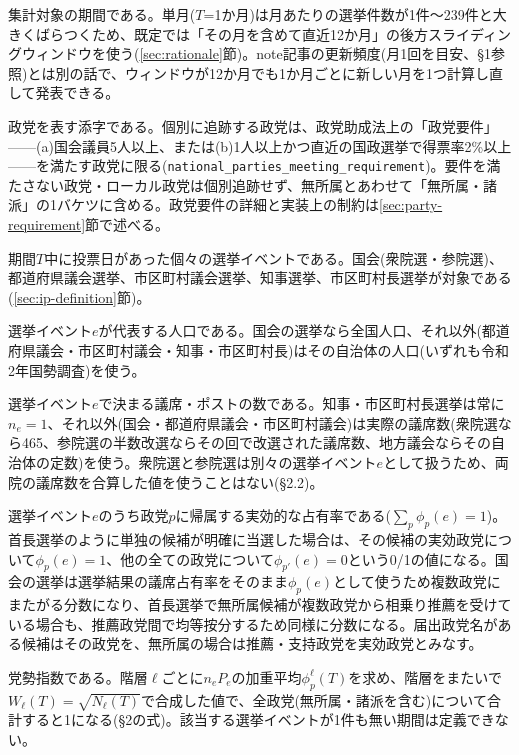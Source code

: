 \documentclass[a4paper,11pt]{ltjsarticle}
\begin{document}
\begin{description}[leftmargin=2.2cm,style=nextline]
  \item[$T$] 集計対象の期間である。単月($T$=1か月)は月あたりの選挙件数が1件〜239件と大きくばらつくため、既定では「その月を含めて直近12か月」の後方スライディングウィンドウを使う(\ref{sec:rationale}節)。note記事の更新頻度(月1回を目安、\S1参照)とは別の話で、ウィンドウが12か月でも1か月ごとに新しい月を1つ計算し直して発表できる。

  \item[$p$] 政党を表す添字である。個別に追跡する政党は、政党助成法上の「政党要件」——(a)国会議員5人以上、または(b)1人以上かつ直近の国政選挙で得票率2\%以上——を満たす政党に限る(\texttt{national\_parties\_meeting\_requirement})。要件を満たさない政党・ローカル政党は個別追跡せず、無所属とあわせて「無所属・諸派」の1バケツに含める。政党要件の詳細と実装上の制約は\ref{sec:party-requirement}節で述べる。

  \item[$e$] 期間$T$中に投票日があった個々の選挙イベントである。国会(衆院選・参院選)、都道府県議会選挙、市区町村議会選挙、知事選挙、市区町村長選挙が対象である(\ref{sec:ip-definition}節)。

  \item[$P_e$] 選挙イベント$e$が代表する人口である。国会の選挙なら全国人口、それ以外(都道府県議会・市区町村議会・知事・市区町村長)はその自治体の人口(いずれも令和2年国勢調査)を使う。

  \item[$n_e$] 選挙イベント$e$で決まる議席・ポストの数である。知事・市区町村長選挙は常に$n_e=1$、それ以外(国会・都道府県議会・市区町村議会)は実際の議席数(衆院選なら465、参院選の半数改選ならその回で改選された議席数、地方議会ならその自治体の定数)を使う。衆院選と参院選は別々の選挙イベント$e$として扱うため、両院の議席数を合算した値を使うことはない(\S2.2)。

  \item[$\phi_p(e)$] 選挙イベント$e$のうち政党$p$に帰属する実効的な占有率である($\sum_p \phi_p(e) = 1$)。首長選挙のように単独の候補が明確に当選した場合は、その候補の実効政党について$\phi_p(e)=1$、他の全ての政党について$\phi_{p'}(e)=0$という0/1の値になる。国会の選挙は選挙結果の議席占有率をそのまま$\phi_p(e)$として使うため複数政党にまたがる分数になり、首長選挙で無所属候補が複数政党から相乗り推薦を受けている場合も、推薦政党間で均等按分するため同様に分数になる。届出政党名がある候補はその政党を、無所属の場合は推薦・支持政党を実効政党とみなす。

  \item[$C_p(T)$] 党勢指数である。階層$\ell$ごとに$n_eP_e$の加重平均$\phi_p^\ell(T)$を求め、階層をまたいで$W_\ell(T)=\sqrt{N_\ell(T)}$で合成した値で、全政党(無所属・諸派を含む)について合計すると1になる(\S2の式)。該当する選挙イベントが1件も無い期間は定義できない。
\end{description}
\end{document}
